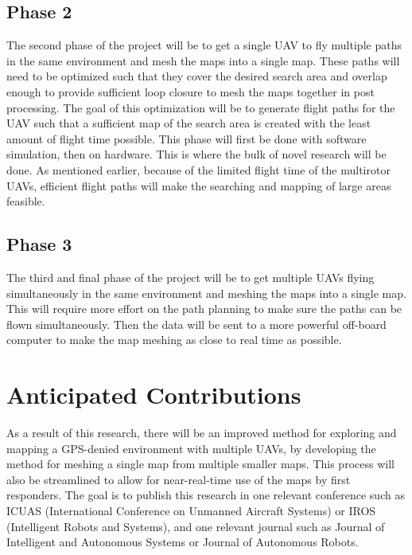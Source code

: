 \documentclass[12pt, letterpaper]{article}
\begin{document}
\subsection{Phase 2}
The second phase of the project will be to get a single UAV to fly multiple paths in the same environment and mesh the maps into a single map. These paths will need to be optimized such that they cover the desired search area and overlap enough to provide sufficient loop closure to mesh the maps together in post processing. The goal of this optimization will be to generate flight paths for the UAV such that a sufficient map of the search area is created with the least amount of flight time possible. This phase will first be done with software simulation, then on hardware. This is where the bulk of novel research will be done. As mentioned earlier, because of the limited flight time of the multirotor UAVs, efficient flight paths will make the searching and mapping of large areas feasible.

\subsection{Phase 3}
The third and final phase of the project will be to get multiple UAVs flying simultaneously in the same environment and meshing the maps into a single map. This will require more effort on the path planning to make sure the paths can be flown simultaneously. Then the data will be sent to a more powerful off-board computer to make the map meshing as close to real time as possible. 


\section{Anticipated Contributions}

As a result of this research, there will be an improved method for exploring and mapping a GPS-denied environment with multiple UAVs, by developing the method for meshing a single map from multiple smaller maps. This process will also be streamlined to allow for near-real-time use of the maps by first responders. The goal is to publish this research in one relevant conference such as ICUAS (International Conference on Unmanned Aircraft Systems) or IROS (Intelligent Robots and Systems), and one relevant journal such as Journal of Intelligent and Autonomous Systems or Journal of Autonomous Robots. 

\pagebreak



\end{document}
